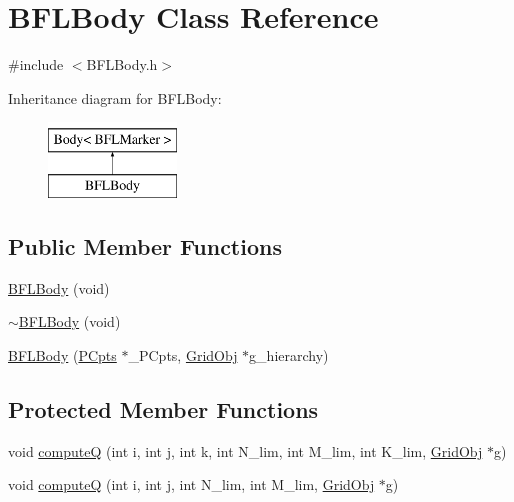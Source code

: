 \hypertarget{class_b_f_l_body}{}\section{B\+F\+L\+Body Class Reference}
\label{class_b_f_l_body}


{\ttfamily \#include $<$B\+F\+L\+Body.\+h$>$}

Inheritance diagram for B\+F\+L\+Body\+:\begin{figure}[H]
\begin{center}
\leavevmode
\includegraphics[height=2.000000cm]{class_b_f_l_body}
\end{center}
\end{figure}
\subsection*{Public Member Functions}
\begin{DoxyCompactItemize}
\item 
\hyperlink{class_b_f_l_body_ab7b3b9f55b59b977401bcf8dead8cfce}{B\+F\+L\+Body} (void)
\item 
\hyperlink{class_b_f_l_body_ad6d343eed8481d8b652261642e184c43}{$\sim$\+B\+F\+L\+Body} (void)
\item 
\hyperlink{class_b_f_l_body_a5dc2907ac609b0fb0a89347b4f66f2ca}{B\+F\+L\+Body} (\hyperlink{class_p_cpts}{P\+Cpts} $\ast$\+\_\+\+P\+Cpts, \hyperlink{class_grid_obj}{Grid\+Obj} $\ast$g\+\_\+hierarchy)
\end{DoxyCompactItemize}
\subsection*{Protected Member Functions}
\begin{DoxyCompactItemize}
\item 
void \hyperlink{class_b_f_l_body_ac220c45e09a037a1f8c596d09d71e3a0}{computeQ} (int i, int j, int k, int N\+\_\+lim, int M\+\_\+lim, int K\+\_\+lim, \hyperlink{class_grid_obj}{Grid\+Obj} $\ast$g)
\item 
void \hyperlink{class_b_f_l_body_a2c98a2521ad9c1a3831a6004f867a307}{computeQ} (int i, int j, int N\+\_\+lim, int M\+\_\+lim, \hyperlink{class_grid_obj}{Grid\+Obj} $\ast$g)
\end{DoxyCompactItemize}
